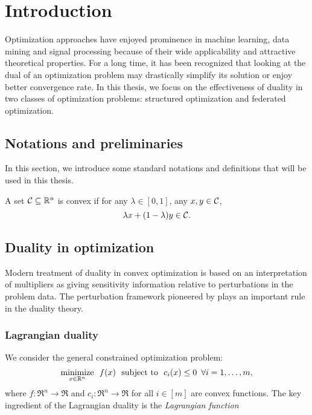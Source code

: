 
\chapter{Introduction}
\label{ch:Introduction}

Optimization approaches have enjoyed prominence in machine learning, data mining and signal processing because of their wide applicability and attractive theoretical properties. For a
long time, it has been recognized that looking at the dual of an optimization problem may drastically simplify its solution or enjoy better convergence rate. In this thesis, we focus on the effectiveness of duality in two classes of optimization problems: structured optimization and federated optimization. 

\section{Notations and preliminaries}

In this section, we introduce some standard notations and definitions that will be used in this thesis. 

\begin{definition}
    A set $\mathcal{C} \subseteq \mathbb{R}^n$ is convex if for any $\lambda \in [0,1]$, any $x, y \in \mathcal{C}$, 
    \[\lambda x + (1-\lambda) y \in \mathcal{C}.\]
\end{definition}

\section{Duality in optimization}

Modern treatment of duality in convex optimization is based on an interpretation of multipliers as giving sensitivity information relative to perturbations in the problem data. The perturbation framework pioneered by \citet{rockafellar1970convex} plays an important rule in the duality theory. 

\subsection{Lagrangian duality}
We consider the general constrained optimization problem:
\begin{equation} \label{prob:gco} 
    \displaystyle\mathop{\hbox{\rm minimize}}_{x \in \mathbb{R}^n}\enspace f(x) \enspace\mathop{\hbox{\rm subject to}}\enspace c_i(x) \leq 0 \enspace \forall i = 1, \dots, m,
\end{equation}
where $f:\Re^n\to\Re$ and $c_i:\Re^n\to\Re$ for all $i\in[m]$ are convex functions. The key ingredient of the Lagrangian duality is the \emph{Lagrangian function}

